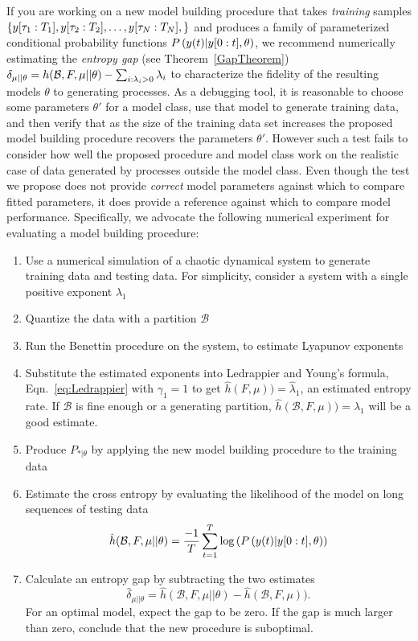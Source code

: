 If you are working on a new model building procedure that takes
\emph{training} samples $\left\{ y[\tau_1:T_1],
  y[\tau_2:T_2], \ldots, y[\tau_N:T_N], \right\}$ and
produces a family of parameterized conditional probability functions
$P \left({y}{(t)}|y[0:t],\theta \right)$, we recommend
numerically estimating the \emph{entropy gap} (see
Theorem~\ref{GapTheorem}) $\delta_{\mu||\theta} =
h({\cal{B}},F,\mu||\theta) - \sum_{i : \lambda_i > 0} \lambda_i$ to
characterize the fidelity of the resulting models $\theta$ to
generating processes.  As a debugging tool, it is reasonable to choose
some parameters $\theta'$ for a model class, use that model to
generate training data, and then verify that as the size of the
training data set increases the proposed model building procedure
recovers the parameters $\theta'$.  However such a test fails to
consider how well the proposed procedure and model class work on the
realistic case of data generated by processes outside the model class.
Even though the test we propose does not provide \emph{correct} model
parameters against which to compare fitted parameters, it does provide
a reference against which to compare model performance.  Specifically,
we advocate the following numerical experiment for evaluating a model
building procedure:
\begin{enumerate}
\item \label{PPB1} Use a numerical simulation of a chaotic dynamical
  system to generate training data and testing data.  For simplicity,
  consider a system with a single positive exponent $\lambda_1$
\item \label{PPB2} Quantize the data with a partition $\mathcal{B}$
\item \label{PPB3} Run the Benettin procedure on the system, to
  estimate Lyapunov exponents
\item \label{PPB4} Substitute the estimated exponents into Ledrappier
  and Young's formula, Eqn.~\eqref{eq:Ledrappier} with $\gamma_1 = 1$
  to get $\hat h(F,\mu)) = \hat \lambda_1$, an estimated entropy rate.
  If $\mathcal{B}$ is fine enough or a generating partition,
  $\hat h(\mathcal{B},F,\mu)) = \hat \lambda_1$ will be a good
  estimate.
\item \label{PPB5} Produce $P_{*|\theta}$ by applying the new model building
  procedure to the training data
\item \label{PPB6} Estimate the cross entropy by evaluating the
  likelihood of the model on long sequences of testing data
  \begin{equation}
    \label{eq:ToyCE}
    \hat h(\mathcal{B},F,\mu||\theta) = \frac{-1}{T} \sum_{t=1}^T \log \left(
    P \left({y}{(t)}|y[0:t],\theta \right)\right)
  \end{equation}
\item \label{PPB7} Calculate an entropy gap  by
  subtracting the two estimates
  \begin{equation*}
    \hat \delta_{\mu||\theta} = \hat h(\mathcal{B},F,\mu||\theta)
    -\hat h(\mathcal{B},F,\mu)).
  \end{equation*}
  For an optimal model, expect the gap to be zero.  If the gap is much
  larger than zero, conclude that the new procedure is suboptimal.
\end{enumerate}
